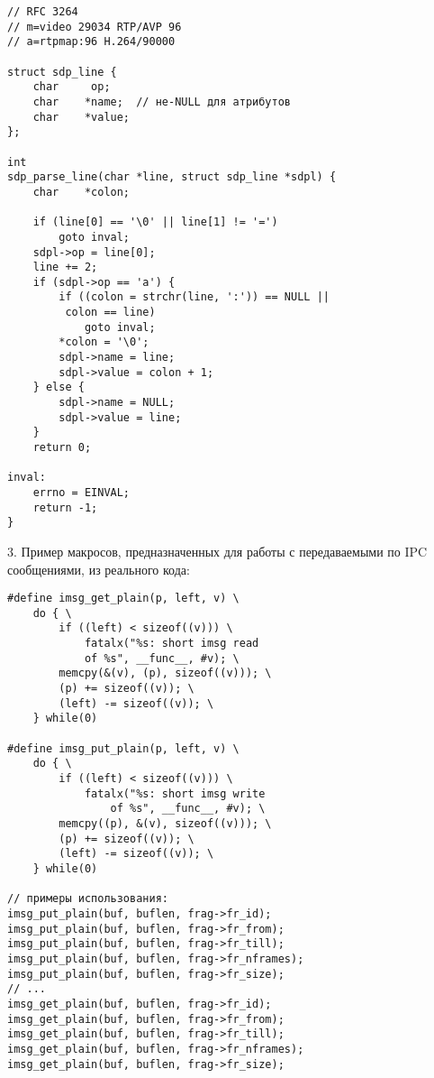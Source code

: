 \documentclass[10pt, a5paper]{article}
\begin{document}
\begin{verbatim}
// RFC 3264
// m=video 29034 RTP/AVP 96
// a=rtpmap:96 H.264/90000

struct sdp_line {
    char     op;
    char    *name;  // не-NULL для атрибутов
    char    *value;
};

int
sdp_parse_line(char *line, struct sdp_line *sdpl) {
    char    *colon;

    if (line[0] == '\0' || line[1] != '=')
        goto inval;
    sdpl->op = line[0];
    line += 2;
    if (sdpl->op == 'a') {
        if ((colon = strchr(line, ':')) == NULL || 
	     colon == line)
            goto inval;
        *colon = '\0';
        sdpl->name = line;
        sdpl->value = colon + 1;
    } else {
        sdpl->name = NULL;
        sdpl->value = line;
    }
    return 0;

inval:
	errno = EINVAL;
	return -1;
}\end{verbatim}
3. Пример макросов, предназначенных для работы с передаваемыми по IPC сообщениями, из реального кода:

\begin{verbatim}
#define imsg_get_plain(p, left, v) \
	do { \
		if ((left) < sizeof((v))) \
			fatalx("%s: short imsg read
 			of %s", __func__, #v); \
		memcpy(&(v), (p), sizeof((v))); \
		(p) += sizeof((v)); \
		(left) -= sizeof((v)); \
	} while(0)

#define imsg_put_plain(p, left, v) \
	do { \
		if ((left) < sizeof((v))) \
			fatalx("%s: short imsg write 
			    of %s", __func__, #v); \
		memcpy((p), &(v), sizeof((v))); \
		(p) += sizeof((v)); \
		(left) -= sizeof((v)); \
	} while(0)

// примеры использования:
imsg_put_plain(buf, buflen, frag->fr_id);
imsg_put_plain(buf, buflen, frag->fr_from);
imsg_put_plain(buf, buflen, frag->fr_till);
imsg_put_plain(buf, buflen, frag->fr_nframes);
imsg_put_plain(buf, buflen, frag->fr_size);
// ...
imsg_get_plain(buf, buflen, frag->fr_id);
imsg_get_plain(buf, buflen, frag->fr_from);
imsg_get_plain(buf, buflen, frag->fr_till);
imsg_get_plain(buf, buflen, frag->fr_nframes);
imsg_get_plain(buf, buflen, frag->fr_size);
\end{verbatim}
\end{document}
